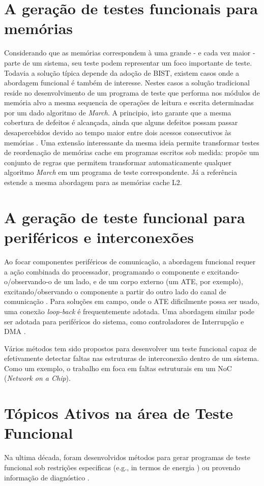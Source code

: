 		\section{A geração de testes funcionais para memórias}
			Considerando que as memórias correspondem à uma grande - e cada vez maior - parte de um sistema, seu teste podem representar um foco importante de teste. Todavia a solução típica depende da adoção de BIST, existem casos onde a abordagem funcional é também de interesse. Nestes casos a solução tradicional reside no desenvolvimento de um programa de teste que performa nos módulos de memória alvo a mesma sequencia de operações de leitura e escrita determinadas por um dado algoritmo de \textit{March}. A principio, isto garante que a mesma cobertura de defeitos é alcançada, ainda que alguns defeitos possam passar desapercebidos devido ao tempo maior entre dois acessos consecutivos às memórias \citep{van2010memory}. Uma extensão interessante da mesma ideia permite transformar testes de reordenação de memórias cache em programas escritos sob medida: \citet{di2011software} propõe um conjunto de regras que permitem transformar automaticamente qualquer algoritmo \textit{March} em um programa de teste correspondente. Já a referência \citet{riga2012functional} estende a mesma abordagem para as memórias cache L2.
		\section{A geração de teste funcional para periféricos e interconexões}
			Ao focar componentes periféricos de comunicação, a abordagem funcional requer a ação combinada do processador, programando o componente e excitando-o/observando-o de um lado, e de um corpo externo (um ATE, por exemplo), excitando/observando o componente a partir do outro lado do canal de comunicação \citep{apostolakis2009test}. Para soluções em campo, onde o ATE dificilmente possa ser usado, uma conexão \textit{loop-back} é frequentemente adotada. Uma abordagem similar pode ser adotada para periféricos do sistema, como controladores de Interrupção e DMA \citep{grosso2012software}.
			
			Vários métodos tem sido propostos para desenvolver um teste funcional capaz de efetivamente detectar faltas nas estruturas de interconexão dentro de um sistema. Como um exemplo, o trabalho em \citet{dalirsani2014structural} foca em faltas estruturais em um NoC (\textit{Network on a Chip}).
		\section{Tópicos Ativos na área de Teste Funcional}
			Na ultima década, foram desenvolvidos métodos para gerar programas de teste funcional sob restrições especificas (e.g., in termos de energia \citep{zhou2006software}) ou provendo informação de diagnóstico \citep{bernardi2008effective}.
			
